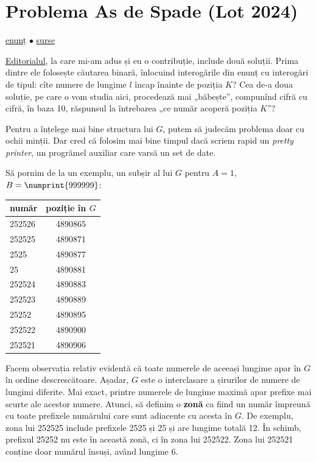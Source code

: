 \documentclass[../main.tex]{subfiles}
\begin{document}
\section{Problema As de Spade (Lot 2024)}
\label{problem:as-de-spade}

\href{https://kilonova.ro/problems/2806}{enunț}
$\bullet$
\hyperref[code:as-de-spade]{surse}

\href{https://github.com/roalgo-discord/Romanian-Olympiad-Solutions/blob/main/Baraj\%20\%2B\%20Lot\%20Seniori\%20(IOI\%20team\%20selection\%20tests)/2024/Lot\%202\%20Seniori\%202024.pdf}{Editorialul}, la care mi-am adus și eu o contribuție, include două soluții. Prima dintre ele folosește căutarea binară, înlocuind interogările din enunț cu interogări de tipul: cîte numere de lungime $l$ încap înainte de poziția $K$? Cea de-a doua soluție, pe care o vom studia aici, procedează mai „băbește”, compunînd cifră cu cifră, în baza 10, răspunsul la întrebarea „ce număr acoperă poziția $K$”?

Pentru a înțelege mai bine structura lui $G$, putem să judecăm problema doar cu ochii minții. Dar cred că folosim mai bine timpul dacă scriem rapid un \textit{pretty printer}, un progrămel auxiliar care varsă un set de date.

Să pornim de la un exemplu, un subșir al lui $G$ pentru $A=1$, $B=\numprint{999999}$:

\begin{table}[H]
  \centering
  \begin{tabular}{ l | c }
    \hline
    număr & poziție în $G$  \\
    \hline
    252526 & 4890865 \\
    252525 & 4890871 \\
    2525 & 4890877 \\
    25 & 4890881 \\
    252524 & 4890883 \\
    252523 & 4890889 \\
    25252 & 4890895 \\
    252522 & 4890900 \\
    252521 & 4890906 \\
    \hline
  \end{tabular}
\end{table}

Facem observația relativ evidentă că toate numerele de aceeași lungime apar în $G$ în ordine descrescătoare. Așadar, $G$ este o interclasare a șirurilor de numere de lungimi diferite. Mai exact, printre numerele de lungime maximă apar prefixe mai scurte ale acestor numere. Atunci, să definim o \textbf{zonă} ca fiind un număr împreună cu toate prefixele numărului care sunt adiacente cu acesta în $G$. De exemplu, zona lui 252525 include prefixele 2525 și 25 și are lungime totală 12. În schimb, prefixul 25252 nu este în această zonă, ci în zona lui 252522. Zona lui 252521 conține doar numărul însuși, având lungime 6.
\end{document}
